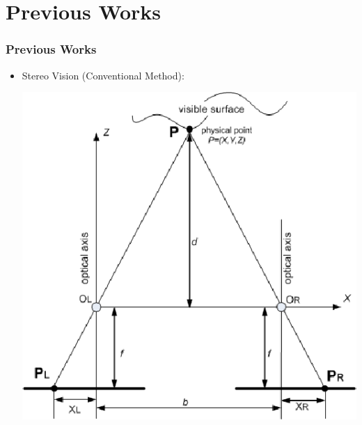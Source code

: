 \documentclass{beamer}
\begin{document}
	\section{Previous Works}
	\begin{frame}
	\frametitle{Previous Works}
	\begin{itemize}
		
		\item Stereo Vision (Conventional Method): \\
		\begin{center}
			\includegraphics[height=0.5\textheight]{imgs/stereo.png}
		\end{center}
	\end{itemize}
	\end{frame}
	
\end{document}
